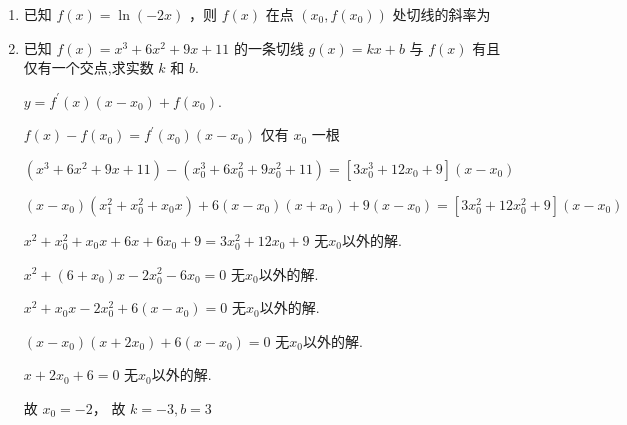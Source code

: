 \begin{enumerate}
\begin{enumerate}
        \item 已知 $f\left( x\right)  = \ln \left( {-{2x}}\right)$ ，则 $f\left( x\right)$ 在点 $\left( {{x}_{0},f\left( {x}_{0}\right) }\right)$ 处切线的斜率为
        \item 已知 $f\left( x\right)  = {x}^{3} + 6{x}^{2} + {9x} + {11}$ 的一条切线 $g\left( x\right)  = {kx} + b$ 与 $f\left( x\right)$ 有且仅有一个交点,求实数 $k$ 和 $b$.
        \begin{jieda}
            $y = {f}^{\prime }\left( x\right) \left( {x - {x}_{0}}\right)  + f(x_0).$

            $f\left( x\right)  - f\left( {x}_{0}\right)  = {f}^{\prime }\left( {x}_{0}\right) \left( {x - {x}_{0}}\right)$ 仅有 ${x}_{0} $ 一根

            $\left( {{x}^{3} + 6{x}^{2} + {9x} + {11}}\right)  - \left( {{x}_{0}^{3} + 6{x}_{0}^{2} + 9{x}_{0}^{2} + {11}}\right)  = \left\lbrack  {3{x}_{0}^{3} + {12}{x}_{0} + 9}\right\rbrack  \left( {x - {x}_{0}}\right)$

            $\left( {x - {x}_{0}}\right) \left({x}_{1}^{2} + {x}_{0}^{2} + {x}_{0}x\right) + 6\left( {x - {x}_{0}}\right) \left( {x + {x}_{0}}\right)  + 9\left( {x - {x}_{0}}\right)  = \left\lbrack  {3{x}_{0}^{2} + {12}{x}_{0}^{2} + 9}\right\rbrack  \left( {x - {x}_{0}}\right)$

            ${x}^{2} + {x}_{0}^{2} + {x}_{0}x + {6x} + {6x_0} + 9 = 3{x}_{0}^{2} + {12}{x}_{0} + 9$ 无$x_0$以外的解.

            ${x}^{2} + \left( {6 + {x}_{0}}\right) x - 2{x}_{0}^{2} - 6{x}_{0} = 0$  无$x_0$以外的解.

            ${x}^{2} + {x}_{0}x - 2{x}_{0}^{2} + 6\left( {x - {x}_{0}}\right)  = 0$ 无$x_0$以外的解.

            $\left( {x - {x}_{0}}\right) \left( {x + 2{x}_{0}}\right)  + 6\left( {x - {x}_{0}}\right)  = 0$ 无$x_0$以外的解.

            ${x} + 2{x}_{0} + 6 = 0$  无$x_0$以外的解.

            故 ${x}_{0} =  - 2$， 故 $k = -3, b =  3$
        \end{jieda}
    \end{enumerate}
    

\end{enumerate}
